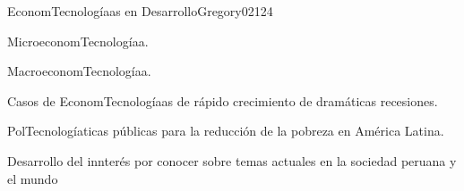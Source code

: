 \begin{syllabus}
\begin{unit}{EconomTecnologíaas en Desarrollo}{}{Gregory02}{12}{4}
   \begin{topics}
      \item MicroeconomTecnologíaa.
      \item MacroeconomTecnologíaa.
      \item Casos de EconomTecnologíaas de rápido crecimiento de dramáticas recesiones.
      \item PolTecnologíaticas públicas para la reducción de la pobreza en América Latina.
   \end{topics}
   \begin{learningoutcomes}
      \item Desarrollo del innterés por conocer sobre temas actuales en la sociedad peruana y el mundo
   \end{learningoutcomes}
\end{unit}



\begin{coursebibliography}
\end{coursebibliography}

\end{syllabus}
